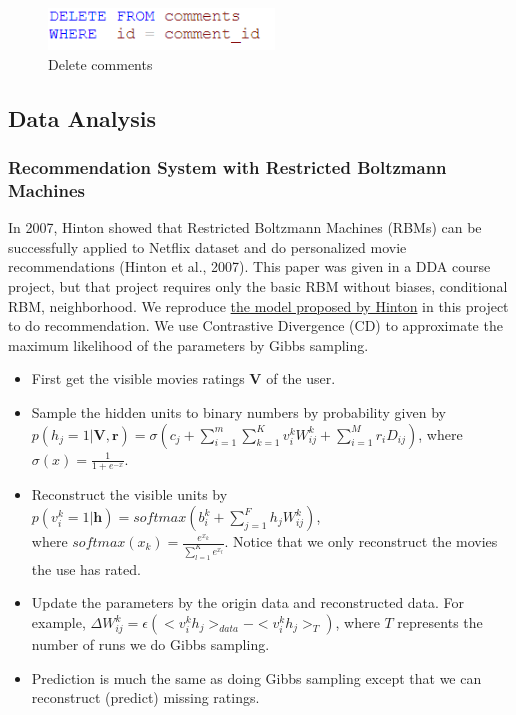 \begin{CJK*}{UTF8}{gbsn}
\begin{figure}[htbp]
\centering
\includegraphics[width=6cm]{del_com.png}
\caption{Delete comments}
\end{figure}


\subsection{Data Analysis}
\subsubsection{Recommendation System with Restricted Boltzmann Machines}

In 2007, Hinton showed that Restricted Boltzmann Machines (RBMs) can be successfully applied to Netflix dataset and do personalized movie recommendations (Hinton et al., 2007). This paper was given in a DDA course project, but that project requires only the basic RBM without biases, conditional RBM, neighborhood. We reproduce \hyperref[RBM]{the model proposed by Hinton} in this project to do recommendation. We use Contrastive Divergence (CD) to approximate the maximum likelihood of the parameters by Gibbs sampling.
\begin{itemize}
    \item First get the visible movies ratings $ \bm{V} $ of the user.
    \item Sample the hidden units to binary numbers by probability given by \\ $ p(h_j = 1 | \bm{V}, \bm{r}) = \sigma(c_j + \sum_{i = 1}^m \sum_{k = 1}^K v_i^k W_{ij}^k + \sum_{i = 1}^M r_i D_{ij}) $, where $ \sigma(x) = \frac{1}{1 + e^{-x}}  $.
    \item Reconstruct the visible units by $ p(v_i^k = 1 | \bm{h}) = softmax(b_i^k + \sum_{j = 1}^F h_j W_{ij}^k) $, \\where $ softmax(x_k) = \frac{e^{x_k}}{\sum_{l= 1}^K e^{x_l}} $. Notice that we only reconstruct the movies the use has rated.
    \item Update the parameters by the origin data and reconstructed data. For example, $ \Delta W_{ij}^k = \epsilon (<v_i^k h_j>_{data} - <v_i^k h_j>_T) $, where $ T $ represents the number of runs we do Gibbs sampling.
    \item Prediction is much the same as doing Gibbs sampling except that we can reconstruct (predict) missing ratings.
\end{itemize}


\end{CJK*}
